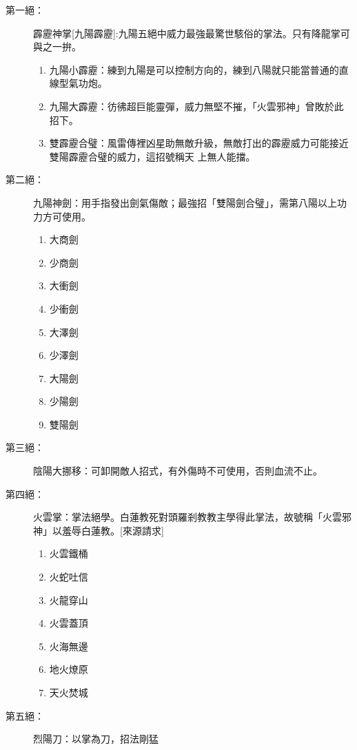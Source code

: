 \begin{description}
\item[第一絕：]霹靂神掌[九陽霹靂]:九陽五絕中威力最強最驚世駭俗的掌法。只有降龍掌可與之一拚。 
  \begin{enumerate}
  \item 九陽小霹靂：練到九陽是可以控制方向的，練到八陽就只能當普通的直線型氣功炮。
  \item 九陽大霹靂：彷彿超巨能靈彈，威力無堅不摧，「火雲邪神」曾敗於此招下。
  \item 雙霹靂合璧：風雷傳裡凶星助無敵升級，無敵打出的霹靂威力可能接近雙陽霹靂合璧的威力，這招號稱天
    上無人能擋。
  \end{enumerate}
\item[第二絕：]九陽神劍：用手指發出劍氣傷敵；最強招「雙陽劍合璧」，需第八陽以上功力方可使用。
  \begin{multicols}{3}
    \begin{enumerate}
    \item 大商劍
    \item 少商劍
    \item 大衝劍
    \item 少衝劍
    \item 大澤劍
    \item 少澤劍
    \item 大陽劍
    \item 少陽劍
    \item 雙陽劍
    \end{enumerate}
  \end{multicols}
\item[第三絕：]陰陽大挪移：可卸開敵人招式，有外傷時不可使用，否則血流不止。
\item[第四絕：]火雲掌：掌法絕學。白蓮教死對頭羅剎教教主學得此掌法，故號稱「火雲邪神」以羞辱白蓮教。[來源請求]
  \begin{multicols}{3}
    \begin{enumerate}
    \item 火雲鐵桶
    \item 火蛇吐信
    \item 火龍穿山
    \item 火雲蓋頂
    \item 火海無邊
    \item 地火燎原
    \item 天火焚城
    \end{enumerate}
  \end{multicols}
\item[第五絕：]烈陽刀：以掌為刀，招法剛猛

\end{description}
